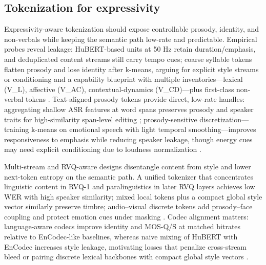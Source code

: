 \documentclass{article}
\begin{document}
\subsection{Tokenization for expressivity} \label{subsec:tokenizationforexpressivity}
Expressivity-aware tokenization should expose controllable prosody, identity, and non-verbals while keeping the semantic path low-rate and predictable. Empirical probes reveal leakage: HuBERT-based units at 50 Hz retain duration/emphasis, and deduplicated content streams still carry tempo cues; coarse syllable tokens flatten prosody and lose identity after k-means, arguing for explicit style streams or conditioning and a capability blueprint with multiple inventories---lexical (V\_L), affective (V\_{AC}), contextual-dynamics (V\_{CD})---plus first-class non-verbal tokens \cite{peng2024empiricalstudyspeechlanguagemodelsprompt,wang2025bossbeyondsemanticspeech}. Text-aligned prosody tokens provide direct, low-rate handles: aggregating shallow ASR features at word spans preserves prosody and speaker traits for high-similarity span-level editing \cite{tseng2025tastetextalignedspeechtokenizationembedd}; prosody-sensitive discretization---training k-means on emotional speech with light temporal smoothing---improves responsiveness to emphasis while reducing speaker leakage, though energy cues may need explicit conditioning due to loudness normalization \cite{onda2025benchmarkingprosodyencodingdiscretespeec}.

Multi-stream and RVQ-aware designs disentangle content from style and lower next-token entropy on the semantic path. A unified tokenizer that concentrates linguistic content in RVQ-1 and paralinguistics in later RVQ layers achieves low WER with high speaker similarity; mixed local tokens plus a compact global style vector similarly preserve timbre; audio--visual discrete tokens add prosody--face coupling and protect emotion cues under masking \cite{zhang2024speechtokenizerunifiedspeechtokenizerlar,messica2024nastnoiseawarespeechtokenizationlanguage,sadok2025vectorquantizedmaskedautoencoderaudiovis}. Codec alignment matters: language-aware codecs improve identity and MOS-Q/S at matched bitrates relative to EnCodec-like baselines, whereas naive mixing of HuBERT with EnCodec increases style leakage, motivating losses that penalize cross-stream bleed or pairing discrete lexical backbones with compact global style vectors \cite{ji2025languagecodecbridgingdiscreterepresentat,peng2024empiricalstudyspeechlanguagemodelsprompt}. 
\end{document}
